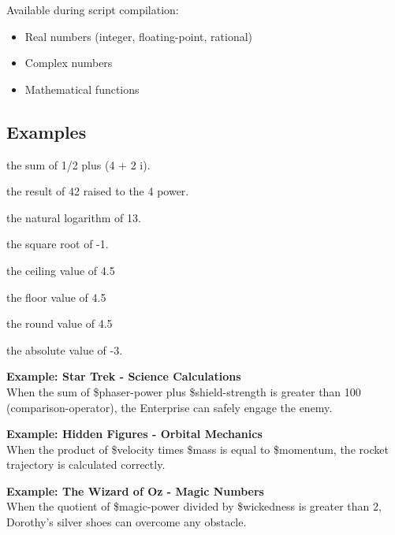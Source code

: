 \documentclass[11pt,letterpaper,oldstylefigures]{memoir}
\newcommand{\stagedir}[1]{#1\par\vspace{1\baselineskip}}
\newenvironment{FountainExample}
  {\begingroup
  \ttfamily\small
   \setlength{\parindent}{0pt}
  \setlength{\parskip}{0.5em}
  \allowdisplaybreaks
  \setlength{\displaywidowpenalty}{0}
  \setlength{\widowpenalty}{0}
  \setlength{\clubpenalty}{0}
  \setlength{\interlinepenalty}{0}
}
  {\endgroup}
\begin{document}
Available during script compilation:
\begin{itemize}
\item Real numbers (integer, floating-point, rational)
\item Complex numbers
\item Mathematical \gls{function}s
\end{itemize}
\subsection{Examples}
\begin{FountainExample}
\stagedir{the sum of 1/2 plus (4 + 2 i).}
\end{FountainExample}
\begin{FountainExample}
\stagedir{the result of 42 raised to the 4 power.}
\end{FountainExample}
\begin{FountainExample}
\stagedir{the natural logarithm of 13.}
\end{FountainExample}
\begin{FountainExample}
\stagedir{the square root of -1.}
\end{FountainExample}
\begin{FountainExample}
\stagedir{the ceiling value of 4.5}
\end{FountainExample}
\begin{FountainExample}
\stagedir{the floor value of 4.5}
\end{FountainExample}
\begin{FountainExample}
\stagedir{the round value of 4.5}
\end{FountainExample}
\begin{FountainExample}
\stagedir{the absolute value of -3.}
\end{FountainExample}

\textbf{Example: Star Trek - Science Calculations}\\
When the sum of \$phaser-power plus \$shield-strength is greater than 100 (\gls{comparison-operator}), the Enterprise can safely engage the enemy.

\textbf{Example: Hidden Figures - Orbital Mechanics}\\
When the product of \$velocity times \$mass is equal to \$momentum, the rocket trajectory is calculated correctly.

\textbf{Example: The Wizard of Oz - Magic Numbers}\\
When the quotient of \$magic-power divided by \$wickedness is greater than 2, Dorothy's silver shoes can overcome any obstacle.
\end{document}
